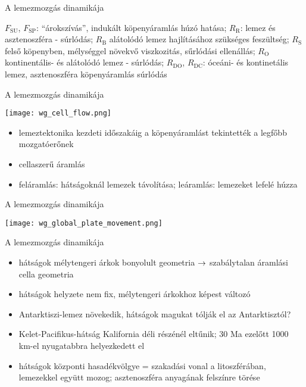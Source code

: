\begin{frame}{A lemezmozgás dinamikája}
    \begin{minic}{0.68}
        \centering
    \end{minic}
    $F_{\text{SU}}$, $F_{\text{SP}}$: ``árokszívás'', indukált köpenyáramlás húzó hatása; $R_{\text{R}}$: lemez és asztenoszféra - súrlódás; $R_{\text{B}}$ alátolódó lemez hajlításához szükséges feszültség; $R_{\text{S}}$ felső köpenyben, mélységgel növekvő viszkozitás, sűrlódási ellenállás; $R_{\text{O}}$ kontinentális- és alátolódó lemez - súrlódás; $R_{\text{DO}}$, $R_{\text{DC}}$: óceáni- és kontinetális lemez, asztenoszféra köpenyáramlás súrlódás
\end{frame}


\begin{frame}{A lemezmozgás dinamikája}
    \begin{center}
        \texttt{[image: wg\_cell\_flow.png]}
    \end{center}
    \begin{itemize}
        \item lemeztektonika kezdeti időszakáig a köpenyáramlást tekintették a legfőbb mozgatóerőnek
        \item cellaszerű áramlás
        \item feláramlás: hátságoknál lemezek távolítása; leáramlás: lemezeket lefelé húzza
    \end{itemize}
\end{frame}


\begin{frame}{A lemezmozgás dinamikája}
    \begin{center}
        \texttt{[image: wg\_global\_plate\_movement.png]}
    \end{center}
\end{frame}


\begin{frame}{A lemezmozgás dinamikája}
    \begin{itemize}
        \item hátságok mélytengeri árkok bonyolult geometria $\rightarrow$ szabálytalan áramlási cella geometria
        \item hátságok helyzete nem fix, mélytengeri árkokhoz képest változó
        \item Antarktiszi-lemez növekedik, hátságok magukat tólják el az Antarktisztól?
        \item Kelet-Pacifikus-hátság Kalifornia déli részénél eltűnik; 30 Ma ezelőtt 1000 km-el nyugatabbra helyezkedett el
        \item hátságok központi hasadékvölgye = szakadási vonal a litoszférában, lemezekkel együtt mozog; asztenoszféra anyagának felszínre törése
    \end{itemize}
\end{frame}



